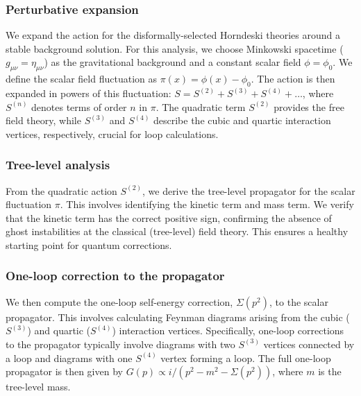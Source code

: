 \documentclass[twocolumn]{aastex631}
\begin{document}
\subsubsection{Perturbative expansion}
We expand the action for the disformally-selected Horndeski theories around a stable background solution. For this analysis, we choose Minkowski spacetime ($g_{\mu\nu} = \eta_{\mu\nu}$) as the gravitational background and a constant scalar field $\phi = \phi_0$. We define the scalar field fluctuation as $\pi(x) = \phi(x) - \phi_0$. The action is then expanded in powers of this fluctuation: $S = S^{(2)} + S^{(3)} + S^{(4)} + \dots$, where $S^{(n)}$ denotes terms of order $n$ in $\pi$. The quadratic term $S^{(2)}$ provides the free field theory, while $S^{(3)}$ and $S^{(4)}$ describe the cubic and quartic interaction vertices, respectively, crucial for loop calculations.

\subsubsection{Tree-level analysis}
From the quadratic action $S^{(2)}$, we derive the tree-level propagator for the scalar fluctuation $\pi$. This involves identifying the kinetic term and mass term. We verify that the kinetic term has the correct positive sign, confirming the absence of ghost instabilities at the classical (tree-level) field theory. This ensures a healthy starting point for quantum corrections.

\subsubsection{One-loop correction to the propagator}
We then compute the one-loop self-energy correction, $\Sigma(p^2)$, to the scalar propagator. This involves calculating Feynman diagrams arising from the cubic ($S^{(3)}$) and quartic ($S^{(4)}$) interaction vertices. Specifically, one-loop corrections to the propagator typically involve diagrams with two $S^{(3)}$ vertices connected by a loop and diagrams with one $S^{(4)}$ vertex forming a loop. The full one-loop propagator is then given by $G(p) \propto i / (p^2 - m^2 - \Sigma(p^2))$, where $m$ is the tree-level mass.
\end{document}
